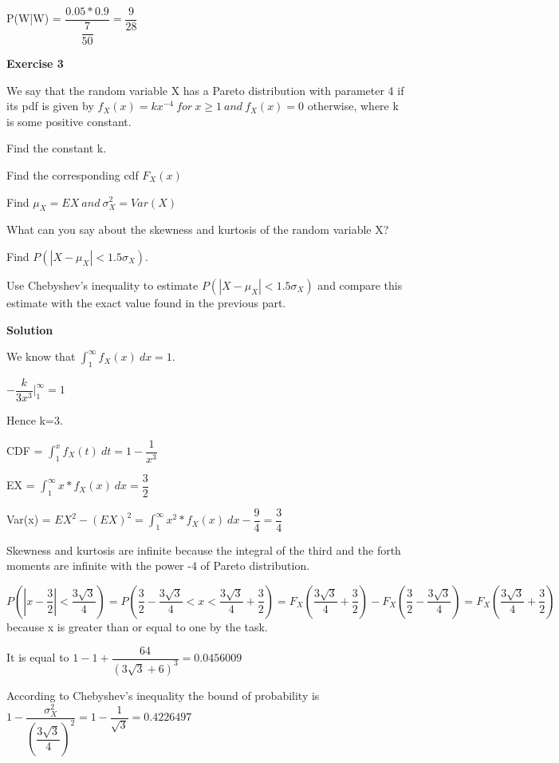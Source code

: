 \documentclass[12pt]{article}
\begin{document}
P(W|W) = $\dfrac{0.05 * 0.9}{\dfrac{7}{50}}=\dfrac{9}{28	}$ 

\bigskip

\textbf{Exercise 3}

We say that the random variable X has a Pareto distribution with parameter 4 if its pdf is given by $f_X(x)=kx^{-4}\ for\ x \geq 1\ and\ f_X(x)=0$ otherwise, where k is some positive constant.

\begin{list}{()~}{}
\item 
Find the constant k.
\item
Find the corresponding cdf $F_X(x)$
\item
Find $\mu_X = EX\ and\ \sigma^2_X = Var(X)$
\item
What can you say about the skewness and kurtosis of the random
variable X?
\item
Find $P(|X-\mu_X| < 1.5 \sigma_X).$
\item
Use Chebyshev’s inequality to estimate $P(|X-\mu_X| < 1.5 \sigma_X)$ and compare this estimate with the exact value found in the previous part.
\end{list}

\medskip		

\textbf{Solution}

\begin{list}{()~}{}
\item
We know that $\int^{\infty}_{1}f_X(x)\ dx=1$.

$-\dfrac{k}{3x^3} \vert ^{\infty}_1=1$

Hence k=3.
\item
CDF = $\int^{x}_{1}f_X(t)\ dt = 1 - \dfrac{1}{x^3}$ 
\item
EX = $\int^{\infty}_{1}x*f_X(x)\ dx = \dfrac{3}{2}$

Var(x) = $EX^2 - (EX)^2= \int^{\infty}_{1}x^2*f_X(x)\ dx - \dfrac{9}{4} = \dfrac{3}{4}$
\item
Skewness and kurtosis are infinite because the integral of the third and the forth moments are infinite with the power -4 of Pareto distribution.
\item
$P(|x-\dfrac{3}{2}|<\dfrac{3\sqrt{3}}{4})=P(\dfrac{3}{2} - \dfrac{3\sqrt{3}}{4}<x<\dfrac{3\sqrt{3}}{4} + \dfrac{3}{2})=F_X(\dfrac{3\sqrt{3}}{4} + \dfrac{3}{2})-F_X(\dfrac{3}{2} - \dfrac{3\sqrt{3}}{4})=F_X(\dfrac{3\sqrt{3}}{4} + \dfrac{3}{2})$ because x is greater than or equal to one by the task.

It is equal to $1-1+\dfrac{64}{(3\sqrt{3}+6)^3}=0.0456009$
\item
According to Chebyshev's inequality the bound of probability is $1 - \dfrac{\sigma^2_X}{(\dfrac{3\sqrt{3}}{4})^2} = 1 - \dfrac{1}{\sqrt{3}}=0.4226497$ 
\end{list}
\end{document}
